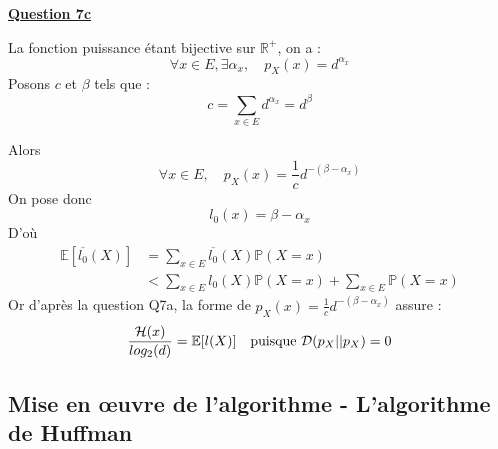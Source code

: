 \documentclass[a4paper,twoside,10pt]{article}
\renewcommand{\H}{\mathcal{H}}
\newcommand{\D}{\mathcal{D}}
\newenvironment{Q}[1]{%
\vspace{1ex}
\underline{\textbf{Question #1\\}}
\newline
}{
\vspace{2ex}
}
\begin{document}
\begin{Q}{7c}
La fonction puissance étant bijective sur $\mathbb{R^+}$, on a :
\[
\forall x \in E, \exists \alpha_x, \quad p_X(x) = d ^{\alpha_x}
\]
Posons $c$ et $\beta$ tels que :
\[
c = \sum_{x \in E} d ^{\alpha_x} = d^\beta
\]

Alors
\[
\forall x \in E, \quad p_X(x) = \frac{1}{c} d^{-(\beta - \alpha_x)}
\]
On pose donc
\[
l_0(x) = \beta - \alpha_x
\]
D'où
\begin{align*}
\mathbb{E}[\overline{l_0}(X)] &= \sum_{x \in E} \overline{l_0}(X) \mathbb{P}(X=x)\\
&< \sum_{x \in E} l_0(X)\mathbb{P}(X=x) + \sum_{x \in E}\mathbb{P}(X=x)
\end{align*}
Or d'après la question Q7a, la forme de $p_X(x)= \frac{1}{c} d^{-(\beta - \alpha_x)}$ assure :
\[
\frac{\H(x)}{log_2(d)} = \mathbb{E}[l(X)] \text{\quad puisque } \D(p_X||p_X) = 0
\]
\end{Q}

\subsection{Mise en œuvre de l'algorithme - L'algorithme de Huffman}
\end{document}
